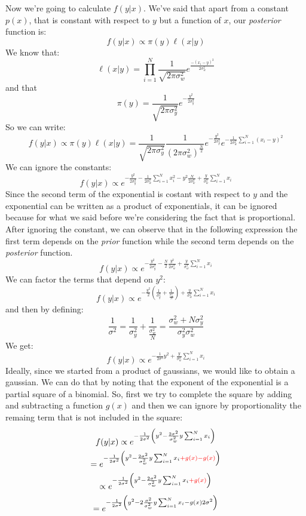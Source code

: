 Now we're going to calculate $f(y|x)$. We've said that apart from a constant $p(x)$, that is constant with respect to $y$ but a function of $x$, our \textit{posterior} function is:
\[
    f(y|x) \propto \pi(y) \ell(x|y)
\]
We know that:
\[
    \ell(x|y) =  \prod_{i = 1}^{N} \frac{1}{\sqrt{2\pi \sigma^2_w}} e^{\frac{-(x_i-y)^2}{2\sigma_w^2}}
\]
and that
\[
    \pi(y) = \frac{1}{\sqrt{2\pi\sigma_y^2}} e^{-\frac{y^2}{2\sigma_y^2}}
\]
So we can write:
\[
    f(y|x) \propto \pi(y) \ell(x|y) = \frac{1}{\sqrt{2\pi\sigma_y^2}} \frac{1}{(2\pi\sigma_w^2)^{\frac{N}{2}}} e^{-\frac{y^2}{2\sigma_y^2}} e^{-\frac{1}{2\sigma_w^2} \sum_{i=1}^{N} (x_i-y)^2}
\]
We can ignore the constants:
\[
    f(y|x) \propto e^{-\frac{y^2}{2\sigma^2_y} - \frac{1}{2\sigma_w^2} \sum_{i=1}^{N} x_i^2 - y^2 \frac{N}{2 \sigma_w^2} + \frac{y}{\sigma_w^2} \sum_{i=1}^{N} x_i}
\]
Since the second term of the exponential is costant with respect to $y$ and the exponential can be written as a product of exponentials, it can be ignored because for what we said before we're considering the fact that is proportional. After ignoring the constant, we can observe that in the following expression the first term depends on the \textit{prior} function while the second term depends on the \textit{posterior} function.
\[
    f(y|x) \propto e^{-\frac{y^2}{2\sigma^2_y} - \frac{N}{2} \frac{y^2}{2 \sigma_w^2} + \frac{y}{\sigma_w^2} \sum_{i=1}^{N} x_i}
\]
We can factor the terms that depend on $y^2$:
\[
    f(y|x) \propto e^{-\frac{y^2}{2}\left(\frac{1}{\sigma_y^2} + \frac{1}{\frac{\sigma^2_w}{N}}\right) + \frac{y}{\sigma_w^2} \sum_{i=1}^{N} x_i}
\]
and then by defining:
\[
    \frac{1}{\sigma^2} = \frac{1}{\sigma_y^2} + \frac{1}{\frac{\sigma^2_w}{N}} =  \frac{\sigma^2_w+N\sigma^2_y}{\sigma^2_y\sigma^2_w}
\]
We get:
\[
    f(y|x) \propto e^{-\frac{1}{2\sigma^2} y^2 + \frac{y}{\sigma_w^2} \sum_{i=1}^N x_i}
\]
Ideally, since we started from a product of gaussians, we would like to obtain a gaussian. We can do that by noting that the exponent of the exponential is a partial square of a binomial.
So, first we try to complete the square by adding and subtracting a function $g(x)$ and then we can ignore by proportionality the remaing term that is not included in the square:
\begin{gather*}
    f(y|x) \propto e^{-\frac{1}{2\sigma^2}\left(y^2 - \frac{2\sigma^2}{\sigma_w^2}y\sum_{i=1}^N x_i \right) } \\
    = e^{-\frac{1}{2\sigma^2}\left(y^2 - \frac{2\sigma^2}{\sigma_w^2}y\sum_{i=1}^N x_i \textcolor{red}{+g(x)-g(x)}\right) } \\
    \propto e^{-\frac{1}{2\sigma^2}\left(y^2 - \frac{2\sigma^2}{\sigma_w^2}y\sum_{i=1}^N x_i \textcolor{red}{+g(x)}\right) } \\
    = e^{-\frac{1}{2\sigma^2} \left(y^2 - 2\frac{\sigma^2}{\sigma_w^2}y\sum_{i=1}^N x_i - g(x)2\sigma^2\right)}
\end{gather*}
